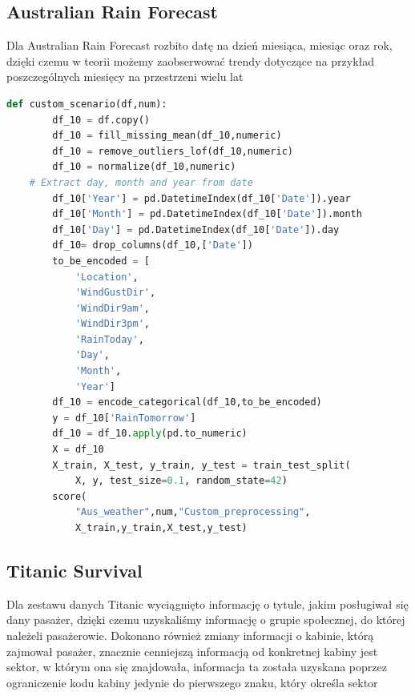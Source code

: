 \documentclass{book}
\begin{document}
\subsection{Australian Rain Forecast}
Dla Australian Rain Forecast rozbito datę na dzień miesiąca, 
miesiąc oraz rok, dzięki czemu w teorii możemy zaobserwować 
trendy dotyczące na przykład poszczególnych miesięcy na przestrzeni 
wielu lat

\begin{lstlisting}[language=Python, caption={Indywidualny 
    scenariusz dla zestawu danych Aus Weather}, captionpos=b]
    def custom_scenario(df,num):
        df_10 = df.copy()
        df_10 = fill_missing_mean(df_10,numeric)
        df_10 = remove_outliers_lof(df_10,numeric)
        df_10 = normalize(df_10,numeric)
    # Extract day, month and year from date
        df_10['Year'] = pd.DatetimeIndex(df_10['Date']).year
        df_10['Month'] = pd.DatetimeIndex(df_10['Date']).month
        df_10['Day'] = pd.DatetimeIndex(df_10['Date']).day
        df_10= drop_columns(df_10,['Date'])
        to_be_encoded = [
            'Location',
            'WindGustDir',
            'WindDir9am',
            'WindDir3pm',
            'RainToday',
            'Day',
            'Month',
            'Year']
        df_10 = encode_categorical(df_10,to_be_encoded)
        y = df_10['RainTomorrow']
        df_10 = df_10.apply(pd.to_numeric)
        X = df_10
        X_train, X_test, y_train, y_test = train_test_split(
            X, y, test_size=0.1, random_state=42)
        score(
            "Aus_weather",num,"Custom_preprocessing",
            X_train,y_train,X_test,y_test)
\end{lstlisting}

\subsection{Titanic Survival}
Dla zestawu danych Titanic wyciągnięto informację o tytule, 
jakim posługiwał się dany pasażer, dzięki czemu uzyskaliśmy 
informację o grupie społecznej, do której należeli pasażerowie. 
Dokonano również zmiany informacji o kabinie, którą zajmował pasażer, 
znacznie cenniejszą informacją od konkretnej kabiny jest sektor, 
w którym ona się znajdowała, informacja ta została uzyskana poprzez 
ograniczenie kodu kabiny jedynie do pierwszego znaku, który 
określa sektor
\end{document}
